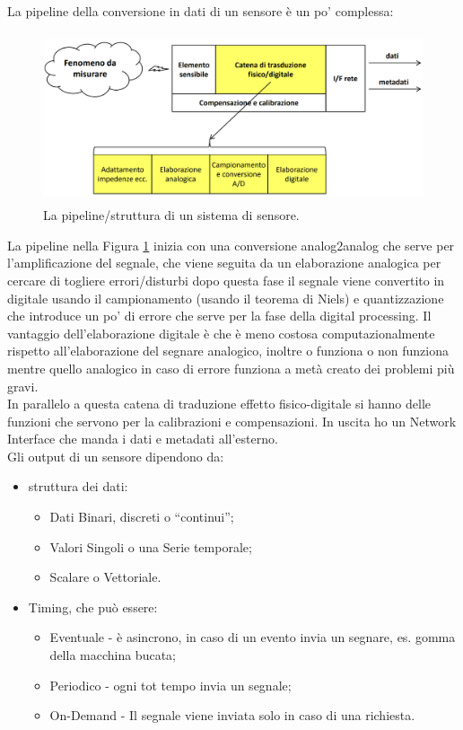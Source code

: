 \documentclass[11pt, twocolumn]{article}
\newenvironment{myitemize}
{ \begin{itemize}[topsep=0ex]
		\setlength{\itemsep}{0pt}
		\setlength{\parskip}{0pt}
		\setlength{\parsep}{0pt}     }
	{ \end{itemize}                  }
\begin{document}
La pipeline della conversione in dati di un sensore è un po' complessa:
\begin{figure}[!h]
  \centering
  \includegraphics[width=\linewidth,height=5cm]{imgs/catena_sensore.png}
  \caption{La pipeline/struttura di un sistema di sensore.}
  \label{fig:circuit_chain}
\end{figure}
\noindent La pipeline nella Figura \ref{fig:circuit_chain} inizia con una conversione analog2analog che serve per l'amplificazione del segnale, che viene seguita da un elaborazione analogica per cercare di togliere errori/disturbi dopo questa fase il segnale viene convertito in digitale usando il campionamento (usando il teorema di Niels) e quantizzazione che introduce un po' di errore che serve per la fase della digital processing.
Il vantaggio dell'elaborazione digitale è che è meno costosa computazionalmente rispetto all'elaborazione del segnare analogico, inoltre o funziona o non funziona mentre quello analogico in caso di errore funziona a metà creato dei problemi più gravi.\\
In parallelo a questa catena di traduzione effetto fisico-digitale si hanno delle funzioni che servono per la calibrazioni e compensazioni.
In uscita ho un Network Interface che manda i dati e metadati all'esterno.\\
Gli output di un sensore dipendono da:
\begin{myitemize}
  \item struttura dei dati:
  \begin{myitemize}
    \item Dati Binari, discreti o ``continui'';
    \item Valori Singoli o una Serie temporale;
    \item Scalare o Vettoriale.      
   \end{myitemize}
  \item Timing, che può essere:
  \begin{myitemize}
    \item Eventuale - è asincrono, in caso di un evento invia un segnare, es. gomma della macchina bucata;
    \item Periodico - ogni tot tempo invia un segnale;
    \item On-Demand - Il segnale viene inviata solo in caso di una richiesta.
  \end{myitemize}
\end{myitemize}
\end{document}
